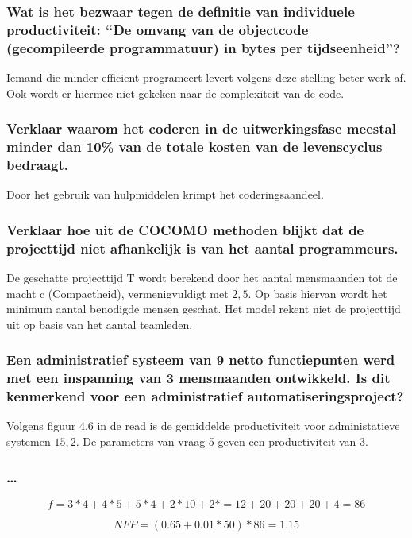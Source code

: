 \documentclass[a4paper,titlepage]{artikel1}
\begin{document}
   \subsubsection[Opdracht 2]{Wat is het bezwaar tegen de definitie van
   individuele productiviteit: ``De omvang van de objectcode
   (gecompileerde programmatuur) in bytes per tijdseenheid''?}
   Iemand die minder efficient programeert levert volgens deze stelling beter werk af. Ook wordt er hiermee niet gekeken naar de complexiteit van de code.
   
   \subsubsection[Opdracht 3]{Verklaar waarom het coderen in de
   uitwerkingsfase meestal minder dan 10\% van de totale kosten van de levenscyclus bedraagt.}
   Door het gebruik van hulpmiddelen krimpt het coderingsaandeel.
   
   \subsubsection[Opdracht 4]{Verklaar hoe uit de COCOMO methoden blijkt dat de projecttijd niet afhankelijk is van het aantal programmeurs.}
   De geschatte projecttijd T wordt berekend door het aantal mensmaanden tot de macht c (Compactheid), vermenigvuldigt met $2,5$. Op basis hiervan wordt het minimum aantal benodigde mensen geschat. Het model rekent niet de projecttijd uit op basis van het aantal teamleden.

   \subsubsection[Opdracht 5]{Een administratief systeem van 9 netto
   functiepunten werd met een inspanning van 3 mensmaanden
   ontwikkeld. Is dit kenmerkend voor een administratief
   automatiseringsproject?}
   Volgens figuur 4.6 in de read is de gemiddelde productiviteit voor administatieve systemen $15,2$. De parameters van vraag 5 geven een productiviteit van $3$.
   
   \subsubsection[Opdracht 6]{\ldots}
   \begin{displaymath}
    f=3*4+4*5+5*4+2*10+2*=12+20+20+20+4=86
   \end{displaymath}
   
   \begin{displaymath}
    NFP=(0.65+0.01*50)*86=1.15
   \end{displaymath}
   
\end{document}
